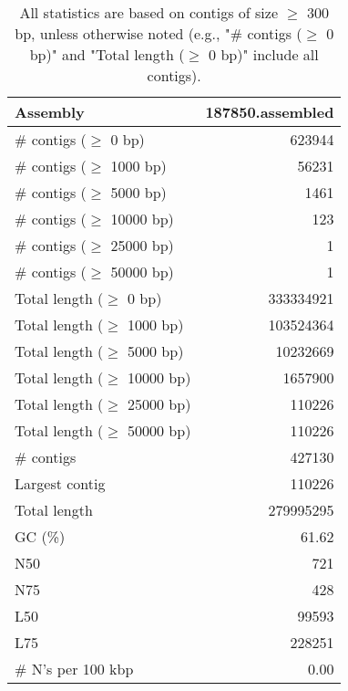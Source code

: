\documentclass[12pt,a4paper]{article}
\begin{document}
\begin{table}[ht]
\begin{center}
\caption{All statistics are based on contigs of size $\geq$ 300 bp, unless otherwise noted (e.g., "\# contigs ($\geq$ 0 bp)" and "Total length ($\geq$ 0 bp)" include all contigs).}
\begin{tabular}{|l*{1}{|r}|}
\hline
Assembly & 187850.assembled \\ \hline
\# contigs ($\geq$ 0 bp) & 623944 \\ \hline
\# contigs ($\geq$ 1000 bp) & 56231 \\ \hline
\# contigs ($\geq$ 5000 bp) & 1461 \\ \hline
\# contigs ($\geq$ 10000 bp) & 123 \\ \hline
\# contigs ($\geq$ 25000 bp) & 1 \\ \hline
\# contigs ($\geq$ 50000 bp) & 1 \\ \hline
Total length ($\geq$ 0 bp) & 333334921 \\ \hline
Total length ($\geq$ 1000 bp) & 103524364 \\ \hline
Total length ($\geq$ 5000 bp) & 10232669 \\ \hline
Total length ($\geq$ 10000 bp) & 1657900 \\ \hline
Total length ($\geq$ 25000 bp) & 110226 \\ \hline
Total length ($\geq$ 50000 bp) & 110226 \\ \hline
\# contigs & 427130 \\ \hline
Largest contig & 110226 \\ \hline
Total length & 279995295 \\ \hline
GC (\%) & 61.62 \\ \hline
N50 & 721 \\ \hline
N75 & 428 \\ \hline
L50 & 99593 \\ \hline
L75 & 228251 \\ \hline
\# N's per 100 kbp & 0.00 \\ \hline
\end{tabular}
\end{center}
\end{table}
\end{document}
